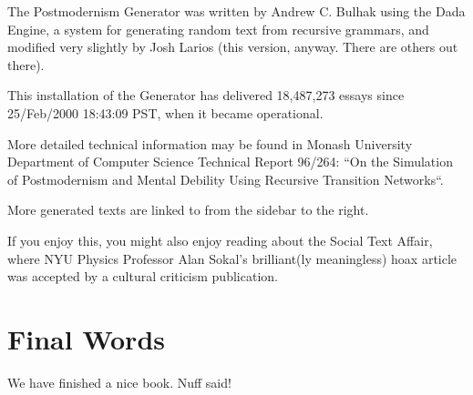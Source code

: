 \documentclass[]{book}
\begin{document}
The Postmodernism Generator was written by Andrew C. Bulhak using the
Dada Engine, a system for generating random text from recursive
grammars, and modified very slightly by Josh Larios (this version,
anyway. There are others out there).

This installation of the Generator has delivered 18,487,273 essays since
25/Feb/2000 18:43:09 PST, when it became operational.

More detailed technical information may be found in Monash University
Department of Computer Science Technical Report 96/264: ``On the
Simulation of Postmodernism and Mental Debility Using Recursive
Transition Networks``.

More generated texts are linked to from the sidebar to the right.

If you enjoy this, you might also enjoy reading about the Social Text
Affair, where NYU Physics Professor Alan Sokal's brilliant(ly
meaningless) hoax article was accepted by a cultural criticism
publication.

\hypertarget{final-words}{%
\chapter{Final Words}\label{final-words}}

We have finished a nice book. Nuff said!


\end{document}
